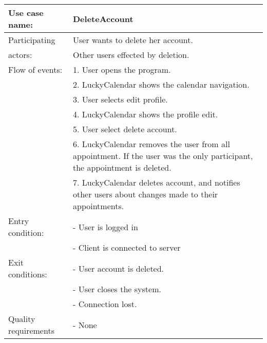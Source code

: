 {\tabulinesep=1.2mm
\begin{tabu}{ | p{3cm} | p{13cm} |}
    \hline
    Use case name: 			& 		DeleteAccount\\ \hline
    Participating  			& 		User wants to delete her account. \\
    actors:					&		Other users effected by deletion.\\ \hline
    Flow of events: 		& 		1. User opens the program. \\
							&		2. LuckyCalendar shows the calendar navigation.\\
							&		3. User selects edit profile.\\
							&		4. LuckyCalendar shows the profile edit.\\
							&		5. User select delete account.\\
							&		6. LuckyCalendar removes the user from all appointment. If the user was the only participant, the appointment is deleted.\\
							&		7. LuckyCalendar deletes account, and notifies other users about changes made to their appointments. \\\hline
    Entry condition: 		& 		- User is logged in  \\
    						&		- Client is connected to server \\\hline
	Exit conditions: 		&		- User account is deleted.\\
							&		- User closes the system.\\
							&		- Connection lost.\\\hline
	Quality requirements	&	 	- None \\\hline
\end{tabu}
}